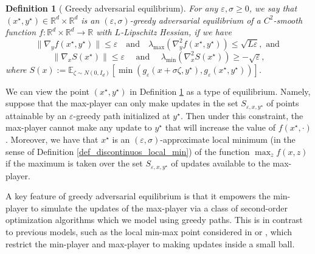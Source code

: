 \documentclass[11pt,letterpaper]{article}
\renewcommand{\epsilon}{\varepsilon}
\newcommand{\coloneqq}{:=}
\newtheorem{definition}[theorem]{Definition}
\begin{document}
\begin{definition}[ Greedy adversarial equilibrium] \label{def:local_min-max_formal} 
For any $\epsilon, \sigma \geq 0$, we say that $(x^\star, y^\star)\in \mathbb{R}^d \times \mathbb{R}^d$ is an $(\epsilon, \sigma)$-greedy adversarial equilibrium of a $C^2$-smooth function $f: \mathbb{R}^d \times \mathbb{R}^d \rightarrow \mathbb{R}$ with $L$-Lipschitz Hessian, if we have
%
\begin{equation} \label{eq:first_order_y}
 \|\nabla_y f(x^\star, y^\star)\| \leq \epsilon
 \quad \textrm{and} \quad
%
 \lambda_{\mathrm{max}}( \nabla^2_{y} f(x^\star, y^\star)) \leq \sqrt{L \epsilon}, \textrm{ and }
\end{equation}
%
  \begin{equation} \label{eq:first_order_x}
  \| \nabla_{x} S(x^\star)\| \leq \epsilon  \quad \textrm{ and }  \quad
%
%
 \lambda_{\mathrm{min}}( \nabla^2_{x} S(x^\star)) \geq -\sqrt{ \epsilon},
  \end{equation} \label{eq_S}
     where $S(x) \coloneqq  \mathbb{E}_{\zeta \sim N(0,I_d)}\left [\min(g_\epsilon(x  + \sigma \zeta, y^\star),  g_\epsilon(x^\star, y^\star)) \right]$.
%
\end{definition}

\noindent
We can view the point $(x^\star, y^\star)$ in Definition \ref{def:local_min-max_formal} as a type of equilibrium.
%
%
 Namely, suppose that the max-player can only make updates in the set $S_{\epsilon, x, y^\star}$ of points attainable by an $\epsilon$-greedy path initialized at $y^\star$.  Then under this constraint, the max-player cannot make any update to $y^\star$ that will increase the value of $f(x^\star, \cdot)$. 
  Moreover, we have that $x^\star$ is an $(\epsilon, \sigma)$-approximate local minimum (in the sense of Definition \ref{def_discontinuos_local_min}) of the function $\max_z f(x,z)$ if the maximum is taken over the set  $S_{\epsilon, x, y^\star}$ of updates available to the max-player.

A key feature of greedy adversarial equilibrium is that it empowers the min-player to simulate the updates of the max-player via a class of second-order optimization algorithms which we model using greedy paths.  This is in contrast to previous models, such as the local min-max point considered in \cite{daskalakis2018limit, heusel2017gans, adolphs2018local} or  \cite{minmax_Jordan}, which restrict the min-player and max-player to making updates inside a small ball.
\end{document}
